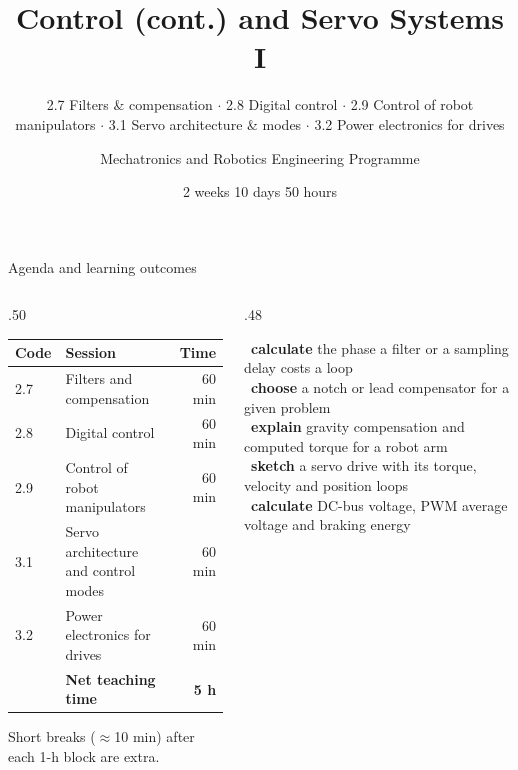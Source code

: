 \documentclass[aspectratio=169,10pt]{beamer}
\title[Control (cont.) \& Servo Systems I]{Control (cont.) and Servo Systems I}
\subtitle{2.7 Filters \& compensation $\cdot$ 2.8 Digital control $\cdot$ 2.9 Control of robot manipulators $\cdot$ 3.1 Servo architecture \& modes $\cdot$ 3.2 Power electronics for drives}
\author{Mechatronics and Robotics Engineering Programme}
\institute{Week 1 \textperiodcentered{} Day 4}
\date{2 weeks \textperiodcentered{} 10 days \textperiodcentered{} 50 hours}
\begin{document}
\begin{frame}[plain]\titlepage\end{frame}

\begin{frame}{Agenda and learning outcomes}
\begin{columns}[T]
\begin{column}{.50\textwidth}
\small
\begin{tabular}{@{}l l r@{}}
\toprule
\textbf{Code} & \textbf{Session} & \textbf{Time}\\
\midrule
2.7 & Filters and compensation & 60 min\\
2.8 & Digital control & 60 min\\
2.9 & Control of robot manipulators & 60 min\\
3.1 & Servo architecture and control modes & 60 min\\
3.2 & Power electronics for drives & 60 min\\
\midrule
 & \textbf{Net teaching time} & \textbf{5 h}\\
\bottomrule
\end{tabular}

\vspace{2mm}
{\scriptsize\color{mkGray}Short breaks ($\approx$10 min) after each 1-h block are extra.}
\end{column}
\begin{column}{.48\textwidth}
\begin{keybox}
\small
\checkitem\ \textbf{calculate} the phase a filter or a sampling delay costs a loop\\[.5mm]
\checkitem\ \textbf{choose} a notch or lead compensator for a given problem\\[.5mm]
\checkitem\ \textbf{explain} gravity compensation and computed torque for a robot arm\\[.5mm]
\checkitem\ \textbf{sketch} a servo drive with its torque, velocity and position loops\\[.5mm]
\checkitem\ \textbf{calculate} DC-bus voltage, PWM average voltage and braking energy
\end{keybox}
\end{column}
\end{columns}
\end{frame}
\end{document}
